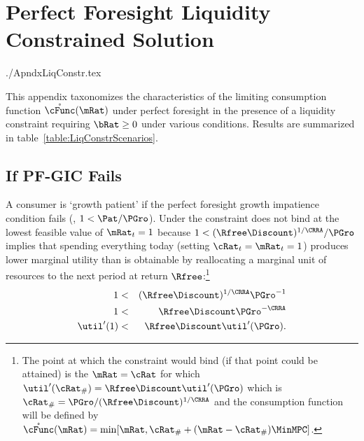 \documentclass{econtex}
\begin{document}
\large

\section{Perfect Foresight Liquidity Constrained Solution}\label{sec:LiqConstrAppendix}


\begin{verbatimwrite}{./ApndxLiqConstr.tex}


  This appendix taxonomizes the characteristics of the limiting
  consumption function $\mathring{\cFunc}(\mRat)$ under perfect
  foresight in the presence of a liquidity constraint requiring $\bRat
  \geq 0$ under various conditions.  Results are summarized in
  table~\ref{table:LiqConstrScenarios}.



\subsection{If PF-GIC Fails}

A consumer is `growth patient' if the perfect foresight growth
impatience condition fails (, $1 < \Pat/\PGro$).  Under
 the constraint does not bind at the lowest feasible value of $\mRat_{t}=1$ because
$1 < (\Rfree\Discount)^{1/\CRRA}/\PGro$ implies that spending
everything today (setting $\cRat_{t}=\mRat_{t}=1$) produces lower
marginal utility than is obtainable by reallocating a marginal unit of
resources to the next period at return $\Rfree$:\footnote{The point at
  which the constraint would bind (if that point could be attained) is
  the $\mRat=\cRat$ for which $\util^{\prime}(\cRat_{\#}) = \Rfree
  \Discount \util^{\prime}(\PGro)$ which is $\cRat_{\#} =
  \PGro/(\Rfree \Discount)^{1/\CRRA}$ and the consumption function
  will be defined by
  $\mathring{\cFunc}(\mRat)=\min[\mRat,\cRat_{\#}+(\mRat-\cRat_{\#})\MinMPC
  ]$.}
\begin{eqnarray}
1 & < & (\Rfree \Discount)^{1/\CRRA}\PGro^{-1}   \label{eq:EulerPFGICFails}
\\ 1 & < & \Rfree \Discount \PGro^{-\CRRA}
\\  \util^{\prime}(1) & < & \Rfree \Discount \util^{\prime}(\PGro)   \label{eq:EulerPFGICFailsEnd}.
\end{eqnarray}


\end{verbatimwrite}
\end{document}
